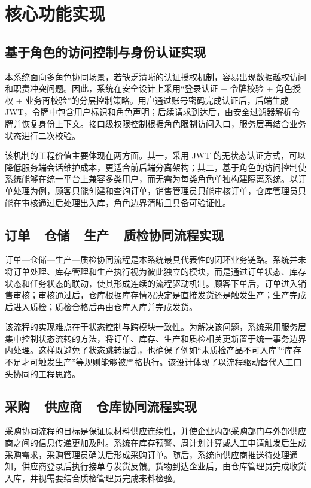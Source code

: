\chapter{核心功能实现}

\section{基于角色的访问控制与身份认证实现}

本系统面向多角色协同场景，若缺乏清晰的认证授权机制，容易出现数据越权访问和职责冲突问题。因此，系统在安全设计上采用“登录认证 + 令牌校验 + 角色授权 + 业务再校验”的分层控制策略。用户通过账号密码完成认证后，后端生成 JWT，令牌中包含用户标识和角色声明；后续请求到达后，由安全过滤器解析令牌并恢复身份上下文。接口级权限控制根据角色限制访问入口，服务层再结合业务状态进行二次校验。

该机制的工程价值主要体现在两方面。其一，采用 JWT 的无状态认证方式，可以降低服务端会话维护成本，更适合前后端分离架构；其二，基于角色的访问控制使系统能够在统一平台上兼容多类用户，而无需为每类角色单独构建隔离系统。以订单处理为例，顾客只能创建和查询订单，销售管理员只能审核订单，仓库管理员只能在审核通过后处理出入库，角色边界清晰且具备可验证性。

\section{订单—仓储—生产—质检协同流程实现}

订单—仓储—生产—质检协同流程是本系统最具代表性的闭环业务链路。系统并未将订单处理、库存管理和生产执行视为彼此独立的模块，而是通过订单状态、库存状态和任务状态的联动，使其形成连续的流程驱动机制。顾客下单后，订单进入销售审核；审核通过后，仓库根据库存情况决定是直接发货还是触发生产；生产完成后进入质检；质检合格后再由仓库入库并完成发货。

该流程的实现难点在于状态控制与跨模块一致性。为解决该问题，系统采用服务层集中控制状态流转的方法，将订单、库存、生产和质检相关更新置于统一事务边界内处理。这样既避免了状态跳转混乱，也确保了例如“未质检产品不可入库”“库存不足才可触发生产”等规则能够被严格执行。该设计体现了以流程驱动替代人工口头协同的工程思路。

\section{采购—供应商—仓库协同流程实现}

采购协同流程的目标是保证原材料供应连续性，并使企业内部采购部门与外部供应商之间的信息传递更加及时。系统在库存预警、周计划计算或人工申请触发后生成采购需求，采购管理员确认后形成采购订单。随后，系统向供应商推送待处理通知，供应商登录后执行接单与发货反馈。货物到达企业后，由仓库管理员完成收货入库，并视需要结合质检管理员完成来料检验。

